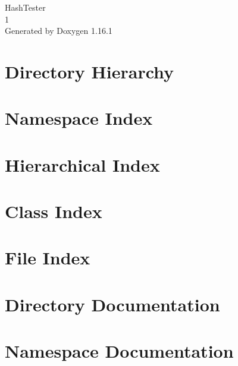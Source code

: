 \documentclass[twoside]{book}
\newcommand{\+}{\discretionary{\mbox{\scriptsize$\hookleftarrow$}}{}{}}
\newcommand{\clearemptydoublepage}{%
    \newpage{\pagestyle{empty}\cleardoublepage}%
  }
\begin{document}
  \raggedbottom
    \hypersetup{pageanchor=false,
                bookmarksnumbered=true,
                pdfencoding=unicode
               }
  \begin{titlepage}
  \vspace*{7cm}
  \begin{center}%
  {\Large Hash\+Tester}\\
  [1ex]\large 1 \\
  \vspace*{1cm}
  {\large Generated by Doxygen 1.16.1}\\
  \end{center}
  \end{titlepage}
  \clearemptydoublepage
  \tableofcontents
  \clearemptydoublepage
  \hypersetup{pageanchor=true}
\chapter{Directory Hierarchy}

\chapter{Namespace Index}

\chapter{Hierarchical Index}

\chapter{Class Index}

\chapter{File Index}

\chapter{Directory Documentation}

\chapter{Namespace Documentation}

\end{document}
